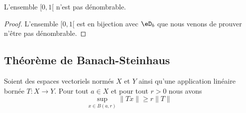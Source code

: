 \begin{corollary}
	L'ensemble \( \mathopen[ 0 , 1 [\) n'est pas dénombrable.
\end{corollary}

\begin{proof}
	L'ensemble \( \mathopen[ 0 , 1 [\) est en bijection avec \( \eD_b\) que nous venons de prouver n'être pas dénombrable.
\end{proof}

\subsection{Théorème de Banach-Steinhaus}

\begin{lemma}     \label{LEMooPIPLooMppGSO}
	Soient des espaces vectoriels normés \( X\) et \( Y\) ainsi qu'une application linéaire bornée \( T\colon X\to Y\). Pour tout \( a\in X\) et pour tout \( r>0\) nous avons
	\begin{equation}
		\sup_{x\in B(a,r)}\| Tx \|\geq r\| T \|
	\end{equation}
\end{lemma}

